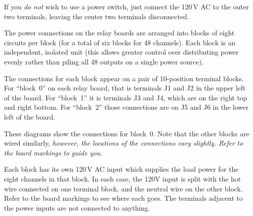 \documentclass[12pt]{article}
\begin{document}
\begin{center}
\end{center}

If you \emph{do not} wish to use a power switch, just connect the 120\,V AC
to the outer two terminals, leaving the center two terminals disconnected.

\begin{center}
\end{center}

The power connections on the relay boards are arranged into blocks of eight
circuits per block (for a total of six blocks for 48 channels).  Each block
is an independent, isolated unit (this allows greater control over
distributing power evenly rather than piling all 48 outputs on a single
power source).

The connections for each block appear on a pair of 10-position terminal
blocks.  For ``block~0'' on each relay board, that is terminals J1 and J2 
in the upper left of the board.  For ``block~1'' it is terminals J3 and J4,
which are on the right top and right bottom.  For ``block~2'' those
connections are on J5 and J6 in the lower left of the board.

These diagrams show the connections for block~0.  Note that the other blocks
are wired similarly, \emph{however, the locations of the connections vary
slightly.  Refer to the board markings to guide you.}

Each block has its own 120\,V AC input which supplies the load power for the
eight channels in that block.  In each case, the 120V input is split with the
hot wire connected on one terminal block, and the neutral wire on the other
block.  Refer to the board markings to see where each goes.  The terminals
adjacent to the power inputs are not connected to anything.
\end{document}
